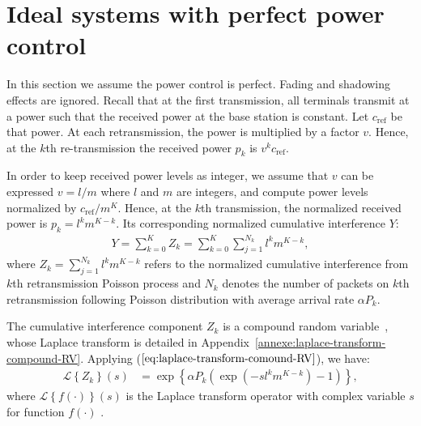 \section{Ideal systems with perfect power control}
\label{sec:ideal_power_control}
In this section we assume the power control is perfect. Fading and shadowing effects are ignored. Recall that at the first transmission, all terminals transmit at a power such that the received power at the base station is constant. Let $c_{\mbox{ref}}$ be that power. At each retransmission, the power is multiplied by a factor $v$. Hence, at the $k$th re-transmission the received power $p_{k}$ is $v^k c_{\text{ref}}$. 

In order to keep received power levels as integer, we assume that $v$ can be expressed $v=l/m$ where $l$ and $m$ are integers, and compute power levels normalized by $c_{\mbox{ref}}/m^K$. Hence, at the $k$th transmission, the normalized received power is $p_k=l^k m^{K-k}$. Its corresponding normalized cumulative interference $Y$:
\begin{align}
	Y= \sum_{k=0}^{K} Z_k = \sum_{k=0}^{K} \sum_{j=1}^{N_k} l^k m^{K-k},
\end{align}
where $Z_k=\sum_{j=1}^{N_k} l^k m^{K-k}$ refers to the normalized cumulative interference from $k$th retransmission Poisson process and $N_k$ denotes the number of packets on $k$th retransmission following Poisson distribution with average arrival rate $\alpha P_k$. 

The cumulative interference component $Z_k$ is a compound random variable~\cite{ross2014introduction}, whose Laplace transform is detailed in Appendix~\ref{annexe:laplace-transform-compound-RV}. Applying ($\ref{eq:laplace-transform-comound-RV}$), we have:
\begin{align*}
\mathcal{L} \left\lbrace Z_k \right\rbrace \left( s \right)
&= \exp\left\lbrace \alpha P_k\left( \exp(-sl^k m^{K-k})-1\right)\right\rbrace, 
\end{align*}
where $\mathcal{L} \left\lbrace f(\cdot) \right\rbrace \left( s \right)$ is the Laplace transform operator with complex variable $s$ for function $f(\cdot)$ .


